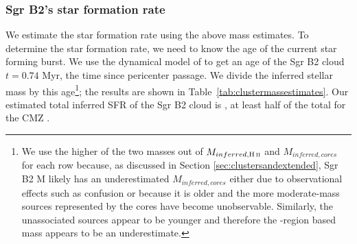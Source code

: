 \documentclass[twocolumn]{aastex61}
\begin{document}
\subsubsection{Sgr B2's star formation rate}
\label{sec:sfr}
We estimate the star formation rate using the above mass estimates.  To
determine the star formation rate, we need to know the age of the current star
forming burst.  We use the dynamical model of \citet{Kruijssen2015a} to get an
age of the Sgr B2 cloud $t=0.74$ Myr, the time since
pericenter passage.  We divide the inferred stellar mass by this
age\footnote{We use the higher of the two masses out of $M_{inferred,\hii}$ and
$M_{inferred,cores}$ for each row because, as discussed in Section
\ref{sec:clustersandextended}, Sgr B2 M likely has an underestimated
$M_{inferred,cores}$ either due to observational effects such as confusion or
because it is older and the more moderate-mass sources represented by the cores
have become unobservable.  Similarly, the unassociated sources appear
to be younger and therefore the \hii-region based mass appears
to be an underestimate.}; the results are shown in
Table~\ref{tab:clustermassestimates}.    Our estimated total inferred SFR of
the Sgr B2 cloud is \sfrdynagemax \msun \peryr,  at least half of the
total for the CMZ \citep[$\dot{M}_{CMZ}=0.07-0.12$ \msun
\peryr;][]{Longmore2013b,Barnes2017b}.  
\end{document}
